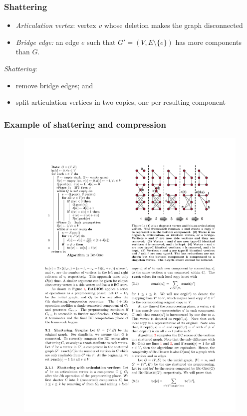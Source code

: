 \begin{frame}
  \frametitle{Shattering}
  \vfill
  \begin{itemize}
    \item \emph{Articulation vertex}: vertex $v$ whose deletion makes the graph disconnected
    \item \emph{Bridge edge:} an edge $e$ such that $G'=(V,E\setminus\{e\})$ has
      more components than $G$.
  \end{itemize}
  \pause
  \vfill
  \emph{Shattering}:
  \begin{itemize}
    \item remove bridge edges; and
    \item split articulation vertices in two copies, one per resulting component
  \end{itemize}
\end{frame}

\begin{frame}
  \frametitle{Example of shattering and compression}
  \begin{figure}
    \includegraphics{figs/shatteringbadios.pdf}
  \end{figure}
\end{frame}

